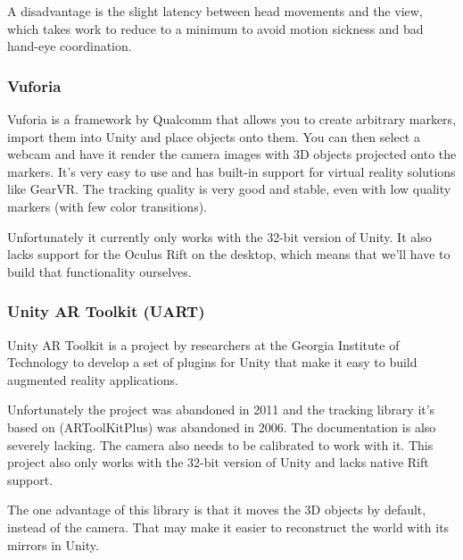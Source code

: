 			A disadvantage is the slight latency between head movements and the
			view, which takes work to reduce to a minimum to avoid motion
			sickness and bad hand-eye coordination.

			\subsubsection{Vuforia} \label{sssec:vuforia}
				Vuforia is a framework by Qualcomm that allows you to create
				arbitrary markers, import them into Unity and place objects onto
				them. \cite{vuforia} You can then select a webcam and have it
				render the camera images with 3D objects projected onto the
				markers. It's very easy to use and has built-in support for
				virtual reality solutions like GearVR. The tracking quality is
				very good and stable, even with low quality markers (with few
				color transitions).

				Unfortunately it currently only works with the 32-bit version of
				Unity. It also lacks support for the Oculus Rift on the desktop,
				which means that we'll have to build that functionality
				ourselves.

			\subsubsection{Unity AR Toolkit (UART)} \label{sssec:uart}
				Unity AR Toolkit \cite{uart} is a project by researchers at the
				Georgia Institute of Technology to develop a set of plugins for
				Unity that make it easy to build augmented reality applications.

				Unfortunately the project was abandoned in 2011 and the tracking
				library it's based on (ARToolKitPlus) was abandoned in 2006. The
				documentation is also severely lacking. The camera also needs to
				be calibrated to work with it. This project also only works with
				the 32-bit version of Unity and lacks native Rift support.

				The one advantage of this library is that it moves the 3D
				objects by default, instead of the camera. That may make it
				easier to reconstruct the world with its mirrors in Unity.

